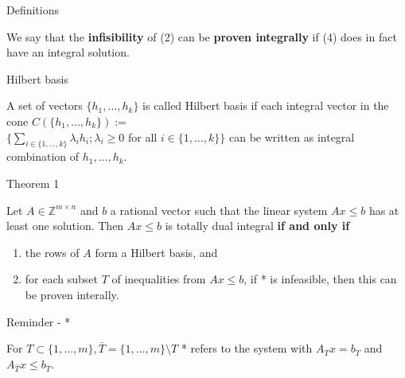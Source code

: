 \documentclass{beamer}
\begin{document}
\begin{frame}{Definitions}

	\begin{block}

		We say that the \textbf{infisibility} of (2) can be \textbf{proven integrally} if (4) does in fact have an integral solution. 

	\end{block}

	\begin{block}{Hilbert basis}

		A set of vectors $\{h_1, \dots, h_k\}$ is called Hilbert basis if each integral vector in the cone $C(\{h_1, \dots, h_k\}) :=$\\ $\{\sum_{i\in \{ 1,\dots,k \}} \lambda_i h_i; \lambda_i \geq 0$ for all $i \in \{1,\dots,k\} \}$ can be written as integral combination of $h_1, \dots, h_k$.

	\end{block}

\end{frame}



\begin{frame}

	\begin{block}{Theorem 1}

		Let $A\in \mathbb{Z}^{m \times n}$ and $b$ a rational vector such that the linear system $Ax \leq b$ has at least one solution. Then $Ax \leq b$ is totally dual integral \textbf{if and only if}\\

		\begin{enumerate}[i]

			\item the rows of $A$ form a Hilbert basis, and

			\item for each subset $T$ of inequalities from $Ax\leq b$, if * is infeasible, then this can be proven interally.

		\end{enumerate}

	\end{block}

	\begin{block}{Reminder - *}

		For $T\subset \{ 1, \dots, m\}, \bar{T} = \{1, \dots, m \} \setminus T$ * refers to the system with $A_T x= b_T$ and $A_{\bar{T}}x\leq b_{\bar{T}}$.

	\end{block}

\end{frame}
\end{document}
